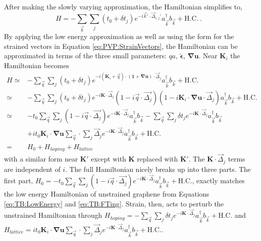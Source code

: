 After making the slowly varying approximation, the Hamiltonian simplifies to,
\begin{equation*}
    H=-\sum_{\vec{k}} \sum_{j} \left( t_0+\delta t_j \right)
    e^{-i\vec{k}'\cdot \vec{\Delta}_{i,j}'}
    a_{\vec{k}}^{\dagger} b_{\vec{k}} +\text{H.C.} \ .
\end{equation*}
By applying the low energy approximation as well as using the form for the strained vectors in Equation \ref{eq:PVP:StrainVectors}, the Hamiltonian can be approximated in terms of the three small parameters: $qa$, $\tilde{\bm{\epsilon}}$, $\bm{\nabla u}$.
Near $\bm{K}_i$ the Hamiltonian becomes 
\begin{align*}
  H\simeq& -\sum_{\vec{q}} \sum_{j} \left( t_0+\delta t_j \right)
    e^{-i (\bm{K}_i+\vec{q}) \cdot (\bm{1}+\bm{\nabla u}) \cdot \vec{\Delta}_{j}}
    a_{\vec{k}}^{\dagger} b_{\vec{k}} +\text{H.C.} \\
   \simeq& -\sum_{\vec{q}} \sum_{j} \left( t_0+\delta t_j \right) e^{-i \bm{K} \cdot \vec{\Delta}_j}
    (1-i \vec{q} \cdot \vec{\Delta_j}) (1-i\bm{K}_i\cdot \bm{\nabla u} \cdot \vec{\Delta}_j)
    a_{\vec{k}}^{\dagger} b_{\vec{k}} +\text{H.C.} \\
   \simeq& 
    -t_0 \sum_{\vec{q}} \sum_{j} (1-i\vec{q} \cdot \vec{\Delta_j}) e^{-i \bm{K} \cdot \vec{\Delta}_j} a_{\vec{k}}^{\dagger}b_{\vec{k}}
    -\sum_{\vec{q}} \sum_{j} \delta t_j e^{-i \bm{K} \cdot \vec{\Delta}_j} a_{\vec{k}}^{\dagger}b_{\vec{k}} \\
    &+i t_0 \bm{K}_i \cdot \bm{\nabla u} \sum_{\vec{q}} \cdot \sum_{j} \vec{\Delta}_j e^{-i \bm{K} \cdot \vec{\Delta}_j} a_{\vec{k}}^{\dagger}b_{\vec{k}}
    +\text{H.C.} \\
   =& H_0+H_{hoping}+H_{lattice}
\end{align*}
with a similar form near $\bm{K'}$ except with $\bm{K}$ replaced with $\bm{K'}$.
The $\bm{K} \cdot \vec{\Delta}_j$ terms are independent of $i$. 
The full Hamiltonian nicely breaks up into three parts.
The first part, $H_0=-t_0 \sum_{\vec{q}} \sum_{j} (1-i\vec{q} \cdot \vec{\Delta_j}) e^{-i \bm{K} \cdot \vec{\Delta}_j} a_{\vec{k}}^{\dagger}b_{\vec{k}}+\text{H.C.}$, exactly matches the low energy Hamiltonian of unstrained graphene from Equations \ref{eq:TB:LowEnergy} and \ref{eq:TB:FTing}.
Strain, then, acts to perturb the unstrained Hamiltonian through $H_{hoping}=-\sum_{\vec{q}} \sum_{j} \delta t_j e^{-i \bm{K} \cdot \vec{\Delta}_j} a_{\vec{k}}^{\dagger}b_{\vec{k}}+\text{H.C.}$ and $H_{lattice}=i t_0 \bm{K}_i \cdot \bm{\nabla u} \sum_{\vec{q}} \cdot \sum_{j} \vec{\Delta}_j e^{-i \bm{K} \cdot \vec{\Delta}_j} a_{\vec{k}}^{\dagger}b_{\vec{k}}+\text{H.C.}$.
